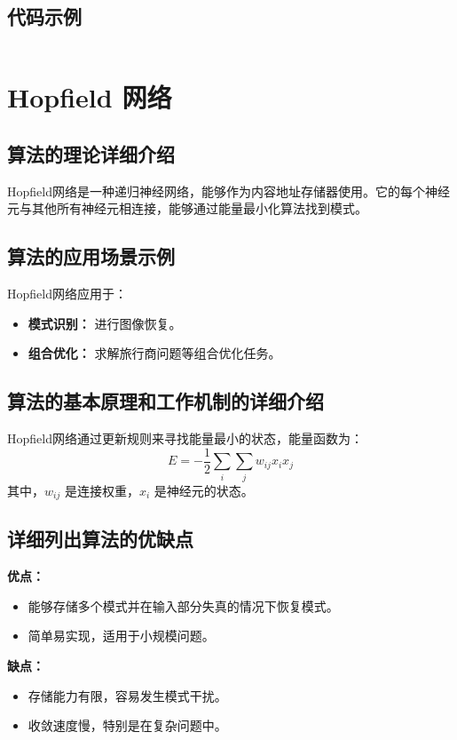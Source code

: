 \subsection*{代码示例}
\begin{lstlisting}

\end{lstlisting}


\section{Hopfield 网络}
\subsection*{算法的理论详细介绍}
Hopfield网络是一种递归神经网络，能够作为内容地址存储器使用。它的每个神经元与其他所有神经元相连接，能够通过能量最小化算法找到模式。

\subsection*{算法的应用场景示例}
Hopfield网络应用于：
\begin{itemize}
    \item \textbf{模式识别：} 进行图像恢复。
    \item \textbf{组合优化：} 求解旅行商问题等组合优化任务。
\end{itemize}

\subsection*{算法的基本原理和工作机制的详细介绍}
Hopfield网络通过更新规则来寻找能量最小的状态，能量函数为：
\[
    E = -\frac{1}{2} \sum_{i} \sum_{j} w_{ij} x_i x_j
\]
其中，\(w_{ij}\) 是连接权重，\(x_i\) 是神经元的状态。

\subsection*{详细列出算法的优缺点}
\textbf{优点：}
\begin{itemize}
    \item 能够存储多个模式并在输入部分失真的情况下恢复模式。
    \item 简单易实现，适用于小规模问题。
\end{itemize}

\textbf{缺点：}
\begin{itemize}
    \item 存储能力有限，容易发生模式干扰。
    \item 收敛速度慢，特别是在复杂问题中。
\end{itemize}

